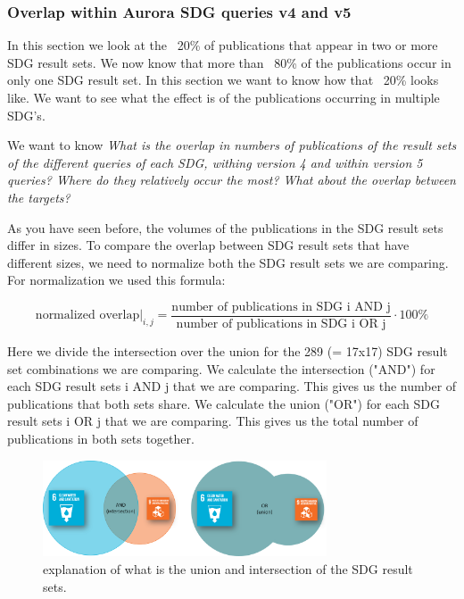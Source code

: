 \documentclass{article}
\begin{document}
\subsubsection{Overlap within Aurora SDG queries v4 and v5}
In this section we look at the ~20\% of publications that appear in two or more SDG result sets. We now know that more than ~80\% of the publications occur in only one SDG result set. In this section we want to know how that ~20\% looks like. We want to see what the effect is of the publications occurring in multiple SDG's.

We want to know \emph{What is the overlap in numbers of publications of the result sets of the different queries of each SDG, withing version 4 and within version 5 queries? Where do they relatively occur the most? What about the overlap between the targets?}

As you have seen before, the volumes of the publications in the SDG result sets differ in sizes. To compare the overlap between SDG result sets that have different sizes, we need to normalize both the SDG result sets we are comparing. For normalization we used this formula:

\begin{equation*}
    \left.\text{normalized overlap}\right|_{i,j} = \frac{\text{number of publications in SDG i AND j}}{\text{number of publications in SDG i OR j}}\cdot 100\%
\end{equation*}

Here we divide the intersection over the union for the 289 (= 17x17) SDG result set combinations we are comparing. 
We calculate the intersection ("AND") for each  SDG result sets i AND j that we are comparing. This gives us the number of publications that both sets share.
We calculate the union ("OR") for each  SDG result sets i OR j that we are comparing. This gives us the total number of publications in both sets together.

\begin{figure}[H]
	\centering
  \includegraphics[width=0.75\textwidth]{figures/SDG-OR-AND-venn-diagrams.png}
	\caption{explanation of what is the union and intersection of the SDG result sets.}
\end{figure}
\end{document}
